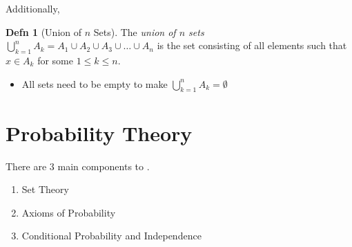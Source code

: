 \documentclass[10pt,letterpaper,final,twoside,notitlepage]{article}
\theoremstyle{plain}
\theoremstyle{definition}
\newtheorem{definition}{Defn}
\begin{document}
	Additionally, 
	\begin{definition}[Union of $n$ Sets]
		The \emph{union of $n$ sets} $\bigcup_{k=1}^{n} A_{k} = A_{1} \cup A_{2} \cup A_{3} \cup \ldots \cup A_{n}$ is the set consisting of all elements such that $x \in A_{k}$ for some $1 \leq k \leq n$.
		\begin{itemize}[noitemsep, nolistsep]
			\item All sets need to be empty to make $\bigcup_{k=1}^{n} A_{k} = \emptyset$
		\end{itemize}
	\end{definition}
	
\section{Probability Theory} \label{sec:Probability Theory}
There are 3 main components to .
\begin{enumerate}
	\item Set Theory
	\item Axioms of Probability
	\item Conditional Probability and Independence
\end{enumerate}
\end{document}
